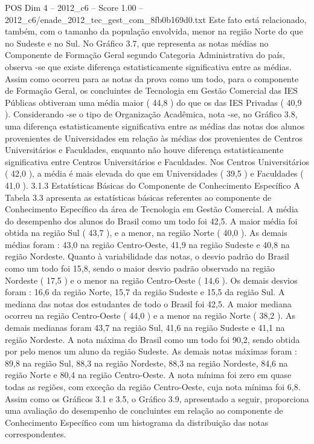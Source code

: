 \begin{textsample}{POS Dim 4 – 2012\_c6 – Score 1.00 – 2012\_c6/enade\_2012\_tec\_gest\_com\_8fb0b169d0.txt}
Este fato está relacionado, também, com o tamanho da população envolvida, menor na região Norte do que no Sudeste e no Sul.
No Gráfico 3.7, que representa as notas médias no Componente de Formação Geral segundo Categoria Administrativa do país, observa -se que existe diferença estatisticamente significativa entre as médias.
Assim como ocorreu para as notas da prova como um todo, para o componente de Formação Geral, os concluintes de Tecnologia em Gestão Comercial das IES Públicas obtiveram uma média maior ( 44,8 ) do que os das IES Privadas ( 40,9 ).
Considerando -se o tipo de Organização Acadêmica, nota -se, no Gráfico 3.8, uma diferença estatisticamente significativa entre as médias das notas dos alunos provenientes de Universidades em relação às médias dos provenientes de Centros Universitários e Faculdades, enquanto não houve diferença estatisticamente significativa entre Centros Universitários e Faculdades.
Nos Centros Universitários ( 42,0 ), a média é mais elevada do que em Universidades ( 39,5 ) e Faculdades ( 41,0 ). 3.1.3 Estatísticas Básicas do Componente de Conhecimento Específico A Tabela 3.3 apresenta as estatísticas básicas referentes ao componente de Conhecimento Específico da área de Tecnologia em Gestão Comercial.
A média do desempenho dos alunos do Brasil como um todo foi 42,5.
A maior média foi obtida na região Sul ( 43,7 ), e a menor, na região Norte ( 40,0 ).
As demais médias foram : 43,0 na região Centro-Oeste, 41,9 na região Sudeste e 40,8 na região Nordeste.
Quanto à variabilidade das notas, o desvio padrão do Brasil como um todo foi 15,8, sendo o maior desvio padrão observado na região Nordeste ( 17,5 ) e o menor na região Centro-Oeste ( 14,6 ).
Os demais desvios foram : 16,6 da região Norte, 15,7 da região Sudeste e 15,5 da região Sul.
A mediana das notas dos estudantes de todo o Brasil foi 42,5.
A maior mediana ocorreu na região Centro-Oeste ( 44,0 ) e a menor na região Norte ( 38,2 ).
As demais medianas foram 43,7 na região Sul, 41,6 na região Sudeste e 41,1 na região Nordeste.
A nota máxima do Brasil como um todo foi 90,2, sendo obtida por pelo menos um aluno da região Sudeste.
As demais notas máximas foram : 89,8 na região Sul, 88,3 na região Nordeste, 88,3 na região Nordeste, 84,6 na região Norte e 80,4 na região Centro-Oeste.
A nota mínima foi zero em quase todas as regiões, com exceção da região Centro-Oeste, cuja nota mínima foi 6,8.
Assim como os Gráficos 3.1 e 3.5, o Gráfico 3.9, apresentado a seguir, proporciona uma avaliação do desempenho de concluintes em relação ao componente de Conhecimento Específico com um histograma da distribuição das notas correspondentes.

\end{textsample}
